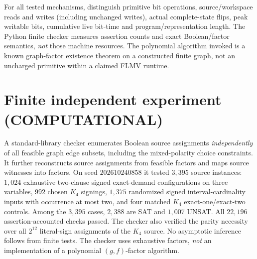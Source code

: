 \documentclass[11pt]{article}
\begin{document}
For all tested mechanisms, distinguish primitive bit operations,
source/workspace reads and writes (including unchanged writes), actual
complete-state flips, peak writable bits, cumulative live bit-time and
program/representation length. The Python finite checker measures
assertion counts and exact Boolean/factor semantics, \emph{not} those
machine resources. The polynomial algorithm invoked is a known
graph-factor existence theorem on a constructed finite graph,
not an uncharged primitive within a claimed FLMV runtime.

\section{Finite independent experiment (COMPUTATIONAL)}
A standard-library checker enumerates Boolean source assignments
\emph{independently} of all feasible graph edge subsets, including the
mixed-polarity choice constraints. It further reconstructs source
assignments from feasible factors and maps source witnesses into factors.
On seed \(202610240858\) it tested \(3,395\) source instances:
\(1,024\) exhaustive two-clause signed exact-demand configurations on
three variables, \(992\) chosen \(K_4\) signings, \(1,375\) randomized
signed interval-cardinality inputs with occurrence at most two, and
four matched \(K_4\) exact-one/exact-two controls.
Among the \(3,395\) cases, \(2,388\) are SAT and \(1,007\) UNSAT.
All \(22,196\) assertion-accounted checks passed.
The checker also verified the parity necessity over all \(2^{12}\)
literal-sign assignments of the \(K_4\) source.
No asymptotic inference follows from finite tests. The checker uses
exhaustive factors, \emph{not} an implementation of a polynomial
\((g,f)\)-factor algorithm.
\end{document}
